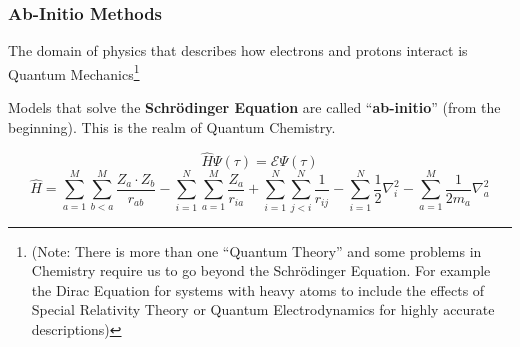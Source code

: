 \documentclass{beamer}
\newcommand{\E}{\mathcal{E}}
\begin{document}
\begin{frame}
	\frametitle{Ab-Initio Methods}
	
	The domain of physics that describes how electrons and protons interact is Quantum Mechanics\footnote{
	(Note: There is more than one “Quantum Theory” and some problems in Chemistry require us to go beyond the Schrödinger Equation. For example the Dirac Equation for systems with heavy atoms to include the effects of Special Relativity Theory or Quantum Electrodynamics for highly accurate descriptions)
	}

	Models that solve the \textbf{Schr\"odinger Equation} are called ``\textbf{ab-initio}'' (from the beginning). This is the realm of Quantum Chemistry.
	
	\[
	\hat{H}\Psi(\tau)=\E\Psi(\tau)
	\]
	\[
	\hat{H}=\sum_{a=1}^{M}\sum_{b<a}^{M}\frac{Z_a\cdot Z_b}{r_{ab}}-\sum_{i=1}^{N}\sum_{a=1}^{M}\frac{Z_a}{r_{ia}}+\sum_{i=1}^{N}\sum_{j<i}^{N}\frac{1}{r_{ij}}-\sum_{i=1}^{N}\frac{1}{2}\nabla_{i}^{2}-\sum_{a=1}^{M}\frac{1}{2m_a}\nabla_{a}^{2}
	\]
	
\end{frame}
\end{document}
